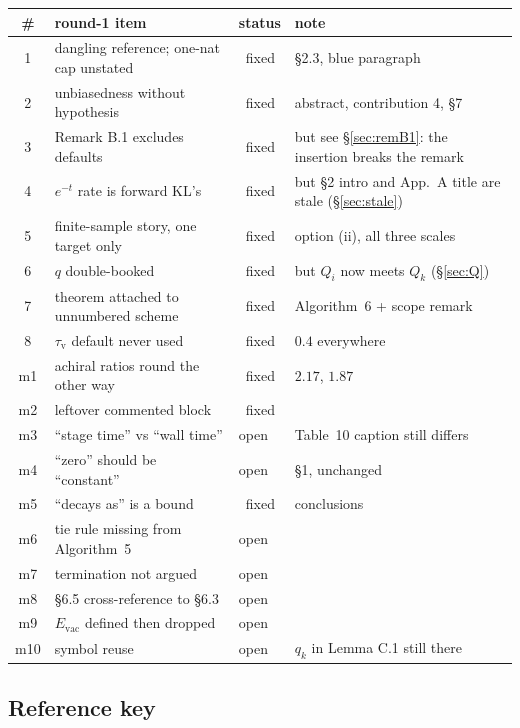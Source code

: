 \documentclass[11pt]{article}
\newcommand{\ok}{\textcolor{green!50!black}{\ding{51}}}
\begin{document}
\begin{center}
\small
\begin{tabular}{@{}clll@{}}
\toprule
\# & round-1 item & status & note \\
\midrule
1 & dangling reference; one-nat cap unstated & \ok\ fixed & \S2.3, blue paragraph \\
2 & unbiasedness without hypothesis & \ok\ fixed & abstract, contribution 4, \S7 \\
3 & Remark B.1 excludes defaults & \ok\ fixed & but see \S\ref{sec:remB1}: the insertion breaks the remark \\
4 & $e^{-t}$ rate is forward KL's & \ok\ fixed & but \S2 intro and App.~A title are stale (\S\ref{sec:stale}) \\
5 & finite-sample story, one target only & \ok\ fixed & option (ii), all three scales \\
6 & $q$ double-booked & \ok\ fixed & but $Q_i$ now meets $Q_k$ (\S\ref{sec:Q}) \\
7 & theorem attached to unnumbered scheme & \ok\ fixed & Algorithm~6 + scope remark \\
8 & $\tau_{\mathrm v}$ default never used & \ok\ fixed & $0.4$ everywhere \\
\midrule
m1 & achiral ratios round the other way & \ok\ fixed & $2.17$, $1.87$ \\
m2 & leftover commented block & \ok\ fixed & \\
m3 & ``stage time'' vs ``wall time'' & open & Table~10 caption still differs \\
m4 & ``zero'' should be ``constant'' & open & \S1, unchanged \\
m5 & ``decays as'' is a bound & \ok\ fixed & conclusions \\
m6 & tie rule missing from Algorithm~5 & open & \\
m7 & termination not argued & open & \\
m8 & \S6.5 cross-reference to \S6.3 & open & \\
m9 & $E_{\mathrm{vac}}$ defined then dropped & open & \\
m10 & symbol reuse & open & $q_k$ in Lemma C.1 still there \\
\bottomrule
\end{tabular}
\end{center}

\subsection*{Reference key}
\end{document}
